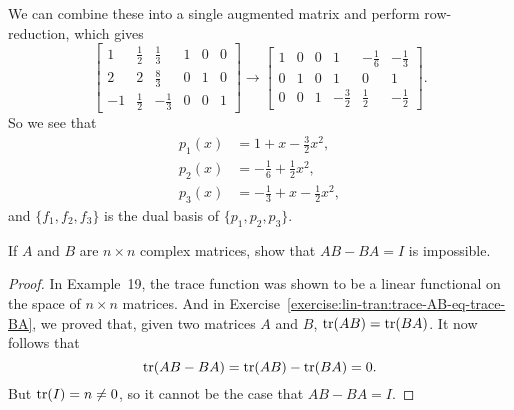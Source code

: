 \begin{solution}
  We can combine these into a single augmented matrix and perform
  row-reduction, which gives
  \begin{equation*}
    \begin{bmatrix}
      1 & \frac12 & \frac13 & 1 & 0 & 0 \\[3pt]
      2 & 2 & \frac83 & 0 & 1 & 0 \\[3pt]
      -1 & \frac12 & -\frac13 & 0 & 0 & 1
    \end{bmatrix}
    \rightarrow
    \begin{bmatrix}
      1 & 0 & 0 & 1 & -\frac16 & -\frac13 \\[3pt]
      0 & 1 & 0 & 1 & 0 & 1 \\[3pt]
      0 & 0 & 1 & -\frac32 & \frac12 & -\frac12
    \end{bmatrix}.
  \end{equation*}
  So we see that
  \begin{align*}
    p_1(x) &= 1 + x - \frac32x^2, \\
    p_2(x) &= -\frac16 + \frac12x^2, \\
    p_3(x) &= -\frac13 + x - \frac12x^2,
  \end{align*}
  and $\{f_1,f_2,f_3\}$ is the dual basis of $\{p_1,p_2,p_3\}$.
\end{solution}

 If $A$ and $B$ are $n\times n$ complex matrices, show that
$AB - BA = I$ is impossible.
\begin{proof}
  In Example~19, the trace function was shown to be a linear
  functional on the space of $n\times n$ matrices. And in
  Exercise~\ref{exercise:lin-tran:trace-AB-eq-trace-BA}, we proved
  that, given two matrices $A$ and $B$, $\operatorname{tr}(AB) = \operatorname{tr}(BA)$. It now
  follows that
  \begin{equation*}
    \operatorname{tr}(AB - BA) = \operatorname{tr}(AB) - \operatorname{tr}(BA) = 0.
  \end{equation*}
  But $\operatorname{tr}(I) = n\neq0$, so it cannot be the case that $AB - BA = I$.
\end{proof}

